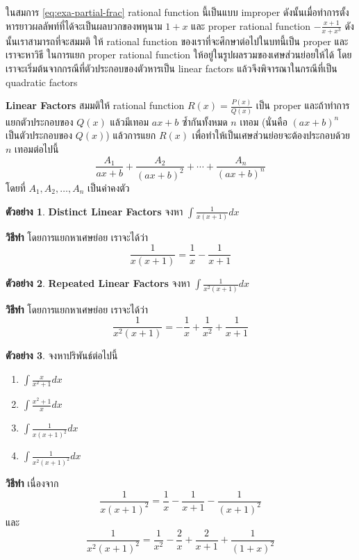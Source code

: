 \documentclass[
]{book}
\theoremstyle{definition}
\theoremstyle{definition}
\newtheorem{example}{ตัวอย่าง}[chapter]
\theoremstyle{definition}
\theoremstyle{definition}
\theoremstyle{remark}
\begin{document}
ในสมการ \eqref{eq:exa-partial-frac} rational function นี้เป็นแบบ improper
ดังนั้นเมื่อทำการตั้งหารยาวผลลัพท์ที่ได้จะเป็นผลบวกของพหุนาม \(1 +x\) และ proper
rational function \(- \frac{x+1}{x + x^3}\) ดังนั้นเราสามารถที่จะสมมติ ให้
rational function ของเราที่จะศึกษาต่อไปในบทนี้เป็น proper และเราจะหาวิธี ในการแยก
proper rational function ให้อยู่ในรูปผลรวมของเศษส่วนย่อยให้ได้
โดยเราจะเริ่มต้นจากกรณีที่ตัวประกอบของตัวหารเป็น linear factors
แล้วจึงพิจารณาในกรณีที่เป็น quadratic factors

\textbf{Linear Factors} สมมติให้ rational function \(R(x) = \frac{P(x)}{Q(x)}\)
เป็น proper และถ้าทำการแยกตัวประกอบของ \(Q(x)\) แล้วมีเทอม \(ax + b\) ซ้ำกันทั้งหมด
\(n\) เทอม (นั่นคือ \((ax +b)^n\) เป็นตัวประกอบของ \(Q(x)\)) แล้วการแยก \(R(x)\)
เพื่อทำให้เป็นเศษส่วนย่อยจะต้องประกอบด้วย \(n\) เทอมต่อไปนี้
\[\frac{A_1}{ax+b} +  \frac{A_2}{(ax+b)^2} + \cdots +  \frac{A_n}{(ax+b)^n}\]
โดยที่ \(A_1, A_2, \ldots, A_n\) เป็นค่าคงตัว

\begin{example}
\textbf{Distinct Linear Factors} จงหา \(\int\frac{1}{x(x+1)} dx\)
\end{example}

\textbf{วิธีทำ} โดยการแยกหาเศษย่อย เราจะได้ว่า
\[\frac{1}{x(x+1)} = \frac{1}{x} - \frac{1}{x+1}\]

\begin{example}
\textbf{Repeated Linear Factors} จงหา \(\int\frac{1}{x^2(x+1)} dx\)
\end{example}

\textbf{วิธีทำ} โดยการแยกหาเศษย่อย เราจะได้ว่า
\[\frac{1}{x^2(x+1)} = -\frac{1}{x} + \frac{1}{x^2} + \frac{1}{x+1}\]

\begin{example}

จงหาปริพันธ์ต่อไปนี้

\begin{enumerate}
\def\labelenumi{\arabic{enumi}.}
\item
  \(\int \frac{x}{x^2+1} dx\)
\item
  \(\int \frac{x^2+1}{x} dx\)
\item
  \(\int \frac{1}{x(x+1)^2} dx\)
\item
  \(\int \frac{1}{x^2(x+1)^2} dx\)
\end{enumerate}

\end{example}

\textbf{วิธีทำ} เนื่องจาก
\[\frac{1}{x(x+1)^2} = \frac{1}{x} -\frac{1}{x+1} -\frac{1}{(x+1)^2}\]
และ
\[\frac{1}{x^2(x+1)^2} = \frac{1}{x^2} - \frac{2}{x} + \frac{2}{x+1} + \frac{1}{(1+x)^2}\]
\end{document}
